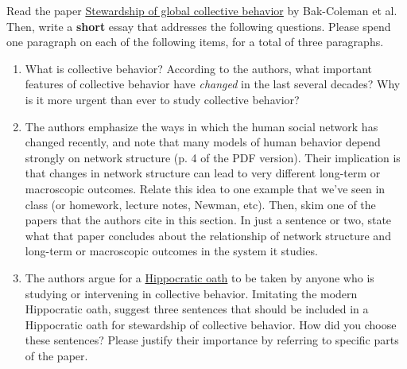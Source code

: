 \documentclass{hw}
\begin{document}

Read the paper \href{https://www.pnas.org/doi/full/10.1073/pnas.2025764118}{Stewardship of global collective behavior} by Bak-Coleman et al. 
Then, write a \textbf{short} essay that addresses the following questions. 
Please spend one paragraph on each of the following items, for a total of three paragraphs. 

\begin{enumerate}
    \item What is collective behavior? According to the authors, what important features of collective behavior have \emph{changed} in the last several decades? Why is it more urgent than ever to study collective behavior? 
    \item The authors emphasize the ways in which the human social network has changed recently, and note that many models of human behavior depend strongly on network structure (p. 4 of the PDF version).  
    Their implication is that changes in network structure can lead to very different long-term or macroscopic outcomes. 
    Relate this idea to one example that we've seen in class (or homework, lecture notes, Newman, etc). 
    Then, skim one of the papers that the authors cite in this section. 
    In just a sentence or two, state what that paper concludes about the relationship of network structure and long-term or macroscopic outcomes in the system it studies. 
    \item The authors argue for a \href{https://en.wikipedia.org/wiki/Hippocratic_Oath#Modern_versions_and_relevance}{Hippocratic oath} to be taken by anyone who is studying or intervening in collective behavior. 
    Imitating the modern Hippocratic oath, suggest three sentences that should be included in a Hippocratic oath for stewardship of collective behavior. 
    How did you choose these sentences? 
    Please justify their importance by referring to specific parts of the paper. 
\end{enumerate}
\end{document}

